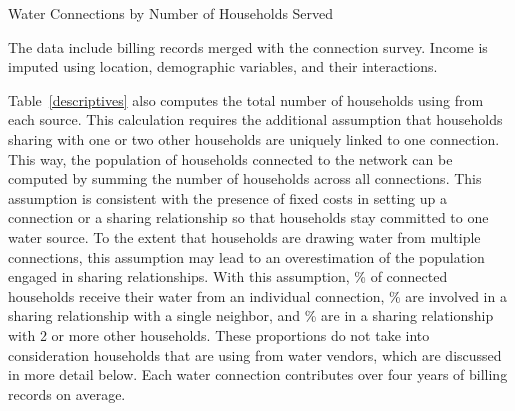 \documentclass[12pt]{article}
\begin{document}
\begin{table}
\centering
\begin{threeparttable}
\caption{ Water Connections  by Number of Households Served}\label{descriptives}

\begin{tablenotes}
\item \footnotesize{The data include billing records merged with the connection survey.  Income is imputed using location, demographic variables, and their interactions.}
\end{tablenotes}
\end{threeparttable}
\end{table} 




Table~\ref{descriptives} also computes the total number of households using from each source.  This calculation requires the additional assumption that households sharing with one or two other households are uniquely linked to one connection.  This way, the population of households connected to the network can be computed by summing the number of households across all connections.  This assumption is consistent with the presence of fixed costs in setting up a connection or a sharing relationship so that households stay committed to one water source.  To the extent that households are drawing water from multiple connections, this assumption may lead to an overestimation of the population engaged in sharing relationships.  With this assumption, \unskip\% of connected households receive their water from an individual connection, \unskip\% are involved in a sharing relationship with a single neighbor, and \unskip\% are in a sharing relationship with 2 or more other households.  These proportions do not take into consideration households that are using from water vendors, which are discussed in more detail below.  Each water connection contributes over four years of billing records on average.
\end{document}
